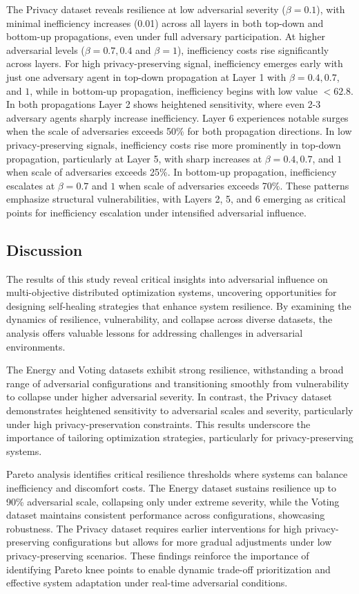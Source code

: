 \documentclass[journal]{IEEEtran}
\begin{document}
The Privacy dataset reveals resilience at low adversarial severity ($\beta = 0.1$), with minimal inefficiency increases (0.01) across all layers in both top-down and bottom-up propagations, even under full adversary participation. At higher adversarial levels ($\beta = 0.7, 0.4$ and $\beta = 1$), inefficiency costs rise significantly across layers. For high privacy-preserving signal, inefficiency emerges early with just one adversary agent in top-down propagation at Layer 1 with $\beta = 0.4, 0.7$, and $1$, while in bottom-up propagation, inefficiency begins with low value $< 62.8$. In both propagations Layer 2 shows heightened sensitivity, where even 2-3 adversary agents sharply increase inefficiency. Layer 6 experiences notable surges when the scale of adversaries exceeds 50\% for both propagation directions. In low privacy-preserving signals, inefficiency costs rise more prominently in top-down propagation, particularly at Layer 5, with sharp increases at $\beta = 0.4, 0.7$, and $1$ when scale of adversaries exceeds 25\%. In bottom-up propagation, inefficiency escalates at $\beta = 0.7$ and $1$ when scale of adversaries exceeds 70\%. These patterns emphasize structural vulnerabilities, with Layers 2, 5, and 6 emerging as critical points for inefficiency escalation under intensified adversarial influence.

\subsection{Discussion} 
The results of this study reveal critical insights into adversarial influence on multi-objective distributed optimization systems, uncovering opportunities for designing self-healing strategies that enhance system resilience. By examining the dynamics of resilience, vulnerability, and collapse across diverse datasets, the analysis offers valuable lessons for addressing challenges in adversarial environments.

The Energy and Voting datasets exhibit strong resilience, withstanding a broad range of adversarial configurations and transitioning smoothly from vulnerability to collapse under higher adversarial severity. In contrast, the Privacy dataset demonstrates heightened sensitivity to adversarial scales and severity, particularly under high privacy-preservation constraints. This results underscore the importance of tailoring optimization strategies, particularly for privacy-preserving systems.

Pareto analysis identifies critical resilience thresholds where systems can balance inefficiency and discomfort costs. The Energy dataset sustains resilience up to 90\% adversarial scale, collapsing only under extreme severity, while the Voting dataset maintains consistent performance across configurations, showcasing robustness. The Privacy dataset requires earlier interventions for high privacy-preserving configurations but allows for more gradual adjustments under low privacy-preserving scenarios. These findings reinforce the importance of identifying Pareto knee points to enable dynamic trade-off prioritization and effective system adaptation under real-time adversarial conditions.
\end{document}
